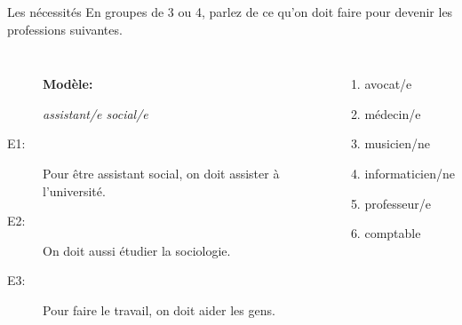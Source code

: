 \documentclass{beamer}
\begin{document}
  \begin{frame}{Les nécessités}
    En groupes de 3 ou 4, parlez de ce qu'on doit faire pour devenir les professions suivantes.\\
    \begin{columns}
        \begin{description}
          \item[] \textbf{Modèle:}
          \item[] \emph{assistant/e social/e}
          \item[E1:] Pour être assistant social, on doit assister à l'université.
          \item[E2:] On doit aussi étudier la sociologie.
          \item[E3:] Pour faire le travail, on doit aider les gens.
        \end{description}
        \begin{enumerate}
          \item avocat/e
          \item médecin/e
          \item musicien/ne
          \item informaticien/ne
          \item professeur/e
          \item comptable
        \end{enumerate}
    \end{columns}
  \end{frame}
\end{document}
